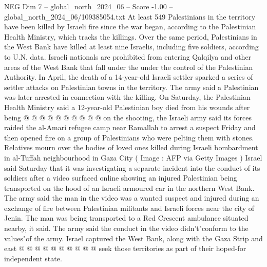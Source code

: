 \begin{textsample}{NEG Dim 7 – global\_north\_2024\_06 – Score -1.00 – global\_north\_2024\_06/109385054.txt}
At least 549 Palestinians in the territory have been killed by Israeli fire since the war began, according to the Palestinian Health Ministry, which tracks the killings.
Over the same period, Palestinians in the West Bank have killed at least nine Israelis, including five soldiers, according to U.N. data.
Israeli nationals are prohibited from entering Qalqilya and other areas of the West Bank that fall under the under the control of the Palestinian Authority.
In April, the death of a 14-year-old Israeli settler sparked a series of settler attacks on Palestinian towns in the territory.
The army said a Palestinian was later arrested in connection with the killing.
On Saturday, the Palestinian Health Ministry said a 12-year-old Palestinian boy died from his wounds after being @ @ @ @ @ @ @ @ @ @ on the shooting, the Israeli army said its forces raided the al-Amari refugee camp near Ramallah to arrest a suspect Friday and then opened fire on a group of Palestinians who were pelting them with stones.
Relatives mourn over the bodies of loved ones killed during Israeli bombardment in al-Tuffah neighbourhood in Gaza City ( Image : AFP via Getty Images ) Israel said Saturday that it was investigating a separate incident into the conduct of its soldiers after a video surfaced online showing an injured Palestinian being transported on the hood of an Israeli armoured car in the northern West Bank.
The army said the man in the video was a wanted suspect and injured during an exchange of fire between Palestinian militants and Israeli forces near the city of Jenin.
The man was being transported to a Red Crescent ambulance situated nearby, it said.
The army said the conduct in the video didn't"conform to the values"of the army.
Israel captured the West Bank, along with the Gaza Strip and east @ @ @ @ @ @ @ @ @ @ seek those territories as part of their hoped-for independent state.

\end{textsample}
